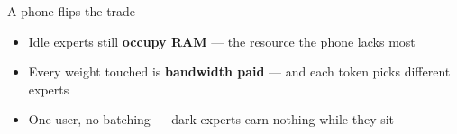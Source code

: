 \begin{frame}{A phone flips the trade}
  \vspace{0.7em}
  \raggedright
  \begin{itemize}\itemsep7pt
    \item Idle experts still \textbf{occupy RAM} --- the resource the phone
      lacks most
    \item Every weight touched is \textbf{bandwidth paid} --- and each token
      picks different experts
    \item One user, no batching --- dark experts earn nothing while they sit
  \end{itemize}

  \vspace{0.9em}
\end{frame}

